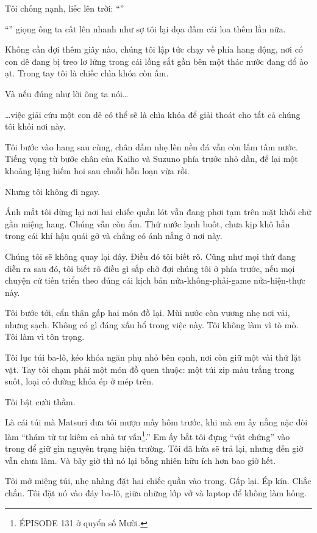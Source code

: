 \documentclass[../main.tex]{subfiles}
\begin{document}
Tôi chống nạnh, liếc lên trời: ``''

``'' giọng ông ta cất lên nhanh như sợ tôi lại dọa đấm cái loa thêm lần nữa.

Không cần đợi thêm giây nào, chúng tôi lập tức chạy về phía hang động, nơi có con dê đang bị treo lơ lửng trong cái lồng sắt gần bên một thác nước đang đổ ào ạt. Trong tay tôi là chiếc chìa khóa còn ấm.

Và nếu đúng như lời ông ta nói\dots

\dots việc giải cứu một con dê có thể sẽ là chìa khóa để giải thoát cho tất cả chúng tôi khỏi nơi này.


Tôi bước vào hang sau cùng, chân dẫm nhẹ lên nền đá vẫn còn lấm tấm nước. Tiếng vọng từ bước chân của Kaiho và Suzuno phía trước nhỏ dần, để lại một khoảng lặng hiếm hoi sau chuỗi hỗn loạn vừa rồi.

Nhưng tôi không đi ngay.

Ánh mắt tôi dừng lại nơi hai chiếc quần lót vẫn đang phơi tạm trên mặt khối chữ gần miệng hang. Chúng vẫn còn ẩm. Thứ nước lạnh buốt, chưa kịp khô hẳn trong cái khí hậu quái gở và chẳng có ánh nắng ở nơi này.

Chúng tôi sẽ không quay lại đây. Điều đó tôi biết rõ. Cũng như mọi thứ đang diễn ra sau đó, tôi biết rõ điều gì sắp chờ đợi chúng tôi ở phía trước, nếu mọi chuyện cứ tiến triển theo đúng cái kịch bản nửa-không-phải-game nửa-hiện-thực này.

Tôi bước tới, cẩn thận gấp hai món đồ lại. Mùi nước còn vương nhẹ nơi vải, nhưng sạch. Không có gì đáng xấu hổ trong việc này. Tôi không làm vì tò mò. Tôi làm vì tôn trọng.

Tôi lục túi ba-lô, kéo khóa ngăn phụ nhỏ bên cạnh, nơi còn giữ một vài thứ lặt vặt. Tay tôi chạm phải một món đồ quen thuộc: một túi zip màu trắng trong suốt, loại có đường khóa ép ở mép trên.

Tôi bật cười thầm.

Là cái túi mà Matsuri đưa tôi mượn mấy hôm trước, khi mà em ấy nằng nặc đòi làm ``thám tử tư kiêm cả nhà tư vấn\footnote{{\flaregothic ÉPISODE 131} ở quyển số Mười.}.'' Em ấy bắt tôi đựng ``vật chứng'' vào trong để giữ gìn nguyên trạng hiện trường. Tôi đã hứa sẽ trả lại, nhưng đến giờ vẫn chưa làm. Và bây giờ thì nó lại bỗng nhiên hữu ích hơn bao giờ hết.

Tôi mở miệng túi, nhẹ nhàng đặt hai chiếc quần vào trong. Gấp lại. Ép kín. Chắc chắn. Tôi đặt nó vào đáy ba-lô, giữa những lớp vở và laptop để không làm hỏng.
\end{document}
